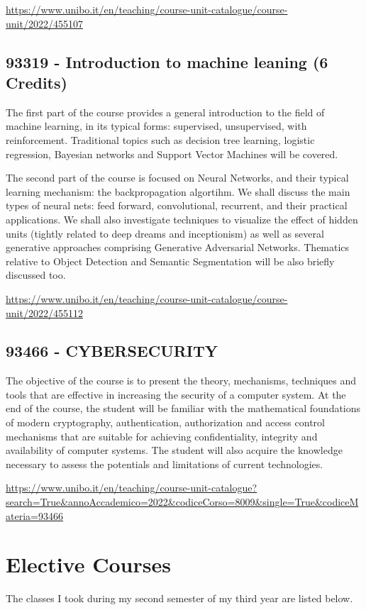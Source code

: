 \documentclass{article}
\begin{document}
\url{https://www.unibo.it/en/teaching/course-unit-catalogue/course-unit/2022/455107}

\subsection{93319 - Introduction to machine leaning (6 Credits)}

The first part of the course provides a general introduction to the field of machine learning, in its typical forms: supervised, unsupervised, with reinforcement. Traditional topics such as decision tree learning, logistic regression, Bayesian networks and Support Vector Machines will be covered.

The second part of the course is focused on Neural Networks, and their typical learning mechanism: the backpropagation algortihm. We shall discuss the main types of neural nets: feed forward, convolutional, recurrent, and their practical applications. We shall also investigate techniques to visualize the effect of hidden units (tightly related to deep dreams and inceptionism) as well as several generative approaches comprising Generative Adversarial Networks. Thematics relative to Object Detection and Semantic Segmentation will be also briefly discussed too.

\url{https://www.unibo.it/en/teaching/course-unit-catalogue/course-unit/2022/455112}

\subsection{93466 - CYBERSECURITY}

The objective of the course is to present the theory, mechanisms, techniques and tools that are effective in increasing the security of a computer system. At the end of the course, the student will be familiar with the mathematical foundations of modern cryptography, authentication, authorization and access control mechanisms that are suitable for achieving confidentiality, integrity and availability of computer systems. The student will also acquire the knowledge necessary to assess the potentials and limitations of current technologies.

\url{https://www.unibo.it/en/teaching/course-unit-catalogue?search=True&annoAccademico=2022&codiceCorso=8009&single=True&codiceMateria=93466}

\section{Elective Courses}

The classes I took during my second semester of my third year are listed below. 
\end{document}
